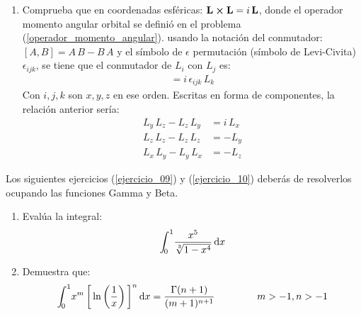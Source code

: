 \begin{enumerate}
\item Comprueba que en coordenadas esféricas: $\vb{L} \cp \vb{L} = i \, \vb{L}$, donde el operador momento angular orbital se definió en el problema (\ref{operador_momento_angular}).
usando la notación del conmutador: $[A, B] = A \, B -  B \, A$ y el símbolo de $\epsilon$ permutación (símbolo de Levi-Civita) $\epsilon_{ijk}$, se tiene que el conmutador de $L_{i}$ con $L_{j}$ es:
\begin{align*}
[L_{i}, L_{j}] = i \, \epsilon_{ijk} \, L_{k}
\end{align*}
Con $i, j, k$ son $x, y, z$ en ese orden. Escritas en forma de componentes, la relación anterior sería:
\begin{align*}
L_{y} \, L_{z} - L_{z} \, L_{y} &= i \, L_{x} \\
L_{z} \, L_{z} - L_{z} \, L_{z} &= - L_{y} \\
L_{x} \, L_{y} - L_{y} \, L_{x} &= - L_{z}
\end{align*}
\end{enumerate}
Los siguientes ejercicios (\ref{ejercicio_09}) y (\ref{ejercicio_10}) deberás de resolverlos ocupando las funciones Gamma y Beta.
\begin{enumerate}[resume]
\item \label{ejercicio_09} Evalúa la integral:
\begin{align*}
\scaleint{5ex}_{\bs 0}^{1} \dfrac{x^{5}}{\sqrt[3]{1 - x^{4}}} \dd{x}
\end{align*}
\item \label{ejercicio_10} Demuestra que:
\begin{align*}
\scaleint{5ex}_{\bs 0}^{1} x^{m} \, \bigg[ \ln \left( \dfrac{1}{x} \right) \bigg]^{n} \dd{x} = \dfrac{\Gamma(n + 1)}{(m + 1)^{n+1}} \hspace{1.5cm} m > -1, n > -1
\end{align*}
\end{enumerate}


